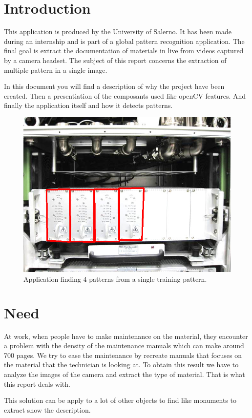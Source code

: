 \documentclass[english,a4paper,11pt]{report}
\begin{document}
	\tableofcontents
	\newpage
	
	
	\chapter{Introduction}
		\par This application is produced by the University of Salerno. It has been made during an internship and is part of a global pattern recognition application. The final goal is extract the documentation of materials in live from videos captured by a camera headset. The subject of this report concerns the extraction of multiple pattern in a single image.
		\par In this document you will find a description of why the project have been created. Then a presentiation of the composants used like openCV features. And finally the application itself and how it detects patterns.\\
		
		\begin{figure}[h]
			\begin{center}
				\includegraphics[scale=0.7]{images_not_compressed/intro.png}
				\caption{Application finding 4 patterns from a single training pattern.}
			\end{center}
		\end{figure}
		
		
	
	\chapter{Need}
		\par At work, when people have to make maintenance on the material, they encounter a problem with the density of the maintenance manuals which can make around 700 pages. We try to ease the maintenance by recreate manuals that focuses on the material that the technician is looking at. To obtain this result we have to analyze the images of the camera and extract the type of material. That is what this report deals with.
		\par This solution can be apply to a lot of other objects to find like monuments to extract show the description. \\
		
\end{document}
